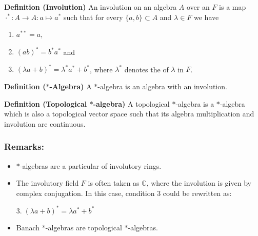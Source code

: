 \documentclass[12pt]{article}
\newenvironment{df}[1][]{\par\noindent\textbf{Definition (#1)}}{}
\begin{document}

\begin{df}[Involution]
An involution on an algebra $A$ over an  $F$ is a map $\cdot^* : A \to A : a \mapsto a^*$ such that for every $\{a, b\} \subset A$ and $\lambda \in F$ we have
\begin{enumerate}
\item $a^{**} = a$,
\item $(ab)^* = b^* a^*$ and
\item $(\lambda a+b)^* = \lambda^*a^* + b^*$, where $\lambda^*$ denotes the  of $\lambda$ in $F$.
\end{enumerate}
\end{df}

\begin{df}[$*$-Algebra]
A $*$-algebra is an algebra with an involution.
\end{df}

\begin{df}[Topological $*$-algebra]
A topological $*$-algebra is a $*$-algebra which is also a topological vector space such that its algebra multiplication and involution are continuous.
\end{df}

\subsubsection{Remarks:}
\begin{itemize}
\item $*$-algebras are a particular  of involutory rings.
\item The involutory field $F$ is often taken as $\mathbb{C}$, where the involution is given by complex conjugation. In this case, condition 3 could be rewritten as:

3.$\;(\lambda a +b)^*= \overline{\lambda}a^*+b^*$
\item Banach *-algebras are topological $*$-algebras.
\end{itemize}

\end{document}
